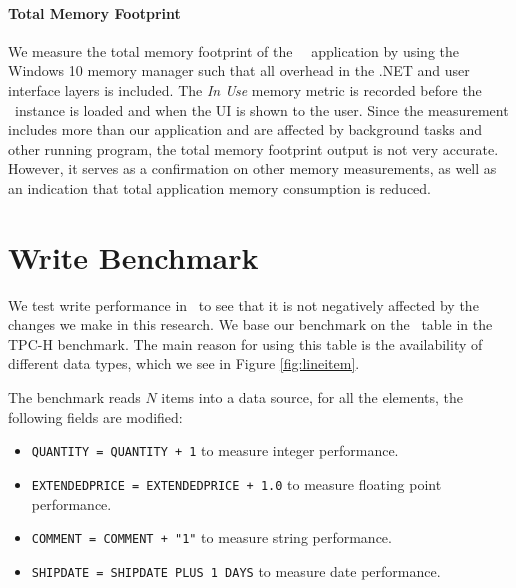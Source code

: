 \paragraph{Total Memory Footprint}
\label{par:Total Memory Footprint}

We measure the total memory footprint of the \tpchdl~\gd~application by using the Windows 10 memory manager such that all overhead in the .NET and user interface layers is included. The \textit{In Use} memory metric is recorded before the \gd~instance is loaded and when the UI is shown to the user. Since the measurement includes more than our application and are affected by background tasks and other running program, the total memory footprint output is not very accurate. However, it serves as a confirmation on other memory measurements, as well as an indication that total application memory consumption is reduced.

\section{Write Benchmark}
\label{bm:write}


We test write performance in \gap~to see that it is not negatively affected by the changes we make in this research. We base our benchmark on the \lineitem~table in the TPC-H benchmark. The main reason for using this table is the availability of different data types, which we see in Figure \ref{fig:lineitem}.

The benchmark reads $N$ items into a data source, for all the elements, the following fields are modified:
\begin{itemize}
    \item \texttt{QUANTITY = QUANTITY + 1} to measure integer performance.
    \item \texttt{EXTENDEDPRICE = EXTENDEDPRICE + 1.0} to measure floating point performance.
    \item \texttt{COMMENT = COMMENT + "1"} to measure string performance.
    \item \texttt{SHIPDATE = SHIPDATE PLUS 1 DAYS} to measure date performance.
\end{itemize}


